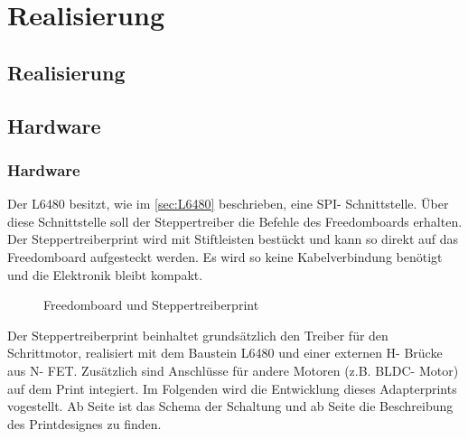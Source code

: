\ifSTANDALONE
\section{Realisierung}
\fi
\ifEMBED
\subsection{Realisierung}
\fi 
    \ifSTANDALONE
    \subsection{Hardware} \label{ch:Hardware}
    \fi
    \ifEMBED
    \subsubsection{Hardware} \label{ch:Hardware}
    \fi
    Der L6480 besitzt, wie im \autoref{sec:L6480} beschrieben, eine SPI- 
    Schnittstelle. Über diese Schnittstelle soll der Steppertreiber die 
    Befehle des Freedomboards erhalten. Der Steppertreiberprint wird mit 
    Stiftleisten bestückt und kann so direkt auf das Freedomboard aufgesteckt 
    werden. Es wird so keine Kabelverbindung benötigt und die Elektronik 
    bleibt kompakt.
    \begin{figure}[h]
        \centering
        \caption{Freedomboard und Steppertreiberprint}
        \label{fig:Steppertreiber}
    \end{figure}
    \newline
    Der Steppertreiberprint beinhaltet grundsätzlich den Treiber für den 
    Schrittmotor, realisiert mit dem Baustein L6480 und einer externen H- 
    Brücke aus N- FET. Zusätzlich sind Anschlüsse für andere Motoren (z.B. 
    BLDC- Motor) auf dem Print integiert. Im Folgenden wird die Entwicklung 
    dieses Adapterprints vogestellt. Ab Seite \pageref{sec:Schema} ist das 
    Schema der Schaltung und ab Seite \pageref{sec:PrintDesign} die 
    Beschreibung des Printdesignes zu finden. 
    \ifSTANDALONE
